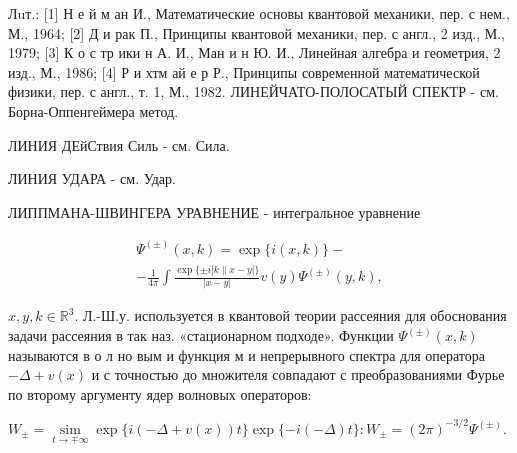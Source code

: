 \documentclass[10pt]{article}
\begin{document}
Лuт.: [1] Н е й м ан И., Математические основы квантовой механики, пер. с нем., М., 1964; [2] Д и рак П., Принципы квантовой механики, пер. с англ., 2 изд., М., 1979; [3] К о с тр ики н А. И., Ман и н Ю. И., Линейная алгебра и геометрия, 2 изд., М., 1986; [4] Р и хтм ай е р Р., Принципы современной математической физики, пер. с англ., т. 1, М., 1982. ЛИНЕЙЧАТО-ПОЛОСАТЫЙ СПЕКТР - см. Борна-Оппенгеймера метод.



ЛИНИЯ ДЕйСтвия Силь - см. Сила.



ЛИНИЯ УДАРА - см. Удар.



ЛИППМАНА-ШВИНГЕРА УРАВНЕНИЕ - интегральное уравнение



\[

\begin{gathered}

\Psi^{( \pm)}(x, k)=\exp \{i(x, k)\}- \\

-\frac{1}{4 \pi} \int \frac{\exp \{ \pm i|k \| x-y|\}}{|x-y|} v(y) \Psi^{( \pm)}(y, k),

\end{gathered}

\]



$x, y, k \in \mathbb{R}^{3}$. Л.-Ш.у. используется в квантовой теории рассеяния для обоснования задачи рассеяния в так наз. «стационарном подходе». Функции $\Psi^{( \pm)}(x, k)$ называются в о л но вым и функция м и непрерывного спектра для оператора $-\Delta+v(x)$ и с точностью до множителя совпадают с преобразованиями Фурье по второму аргументу ядер волновых операторов:



$W_{ \pm}=\underset{t \rightarrow \mp \infty}{\operatorname{sim}} \exp \{i(-\Delta+v(x)) t\} \exp \{-i(-\Delta) t\}: W_{ \pm}=(2 \pi)^{-3 / 2} \Psi^{( \pm)}$.
\end{document}
